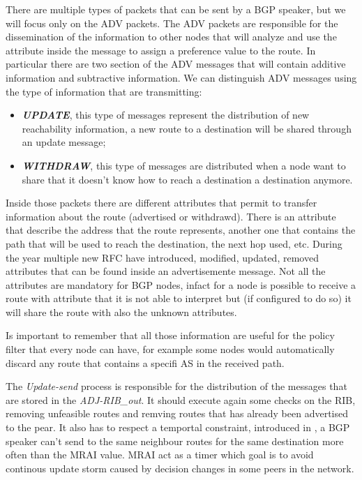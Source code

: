 There are multiple types of packets that can be sent by a \ac{BGP} speaker, but
we will focus only on the \ac{ADV} packets.
The \ac{ADV} packets are responsible for the dissemination of the information
to other nodes that will analyze and use the attribute inside the message
to assign a preference value to the route.
In particular there are two section of the \ac{ADV} messages that will 
contain additive information and subtractive information.
We can distinguish \ac{ADV} messages using the type of information that are 
transmitting:
\begin{itemize}
	\item \textbf{\textit{UPDATE}}, this type of messages represent the distribution
		of new reachability information, a new route to a destination will be
		shared through an update message;
	\item \textbf{\textit{WITHDRAW}}, this type of messages are distributed when
		a node want to share that it doesn't know how to reach a destination
		a destination anymore.
\end{itemize}
Inside those packets there are different attributes that permit to transfer 
information about the route (advertised or withdrawd).
There is an attribute that describe the address that the route represents,
another one that contains the path that will be used to reach the 
destination, the next hop used, etc.
During the year multiple new \ac{RFC} have introduced, modified, updated, removed
attributes that can be found inside an advertisemente message.
Not all the attributes are mandatory for \ac{BGP} nodes, infact for a node
is possible to receive a route with attribute that it is not able to interpret
but (if configured to do so) it will share the route with also the unknown 
attributes.

Is important to remember that all those information are useful for the policy
filter that every node can have, for example some nodes would automatically discard
any route that contains a specifi \ac{AS} in the received path.

The \textit{Update-send} process is responsible for the distribution of the 
messages that are stored in the \textit{ADJ-RIB\_out}.
It should execute again some checks on the \ac{RIB}, removing unfeasible routes
and remving routes that has already been advertised to the pear.
It also has to respect a temportal constraint, introduced in \cite{rfc4271}, 
a \ac{BGP} speaker can't send to the same neighbour routes for the same destination
more often than the \ac{MRAI} value.
\ac{MRAI} act as a timer which goal is to avoid continous update storm caused
by decision changes in some peers in the network.

